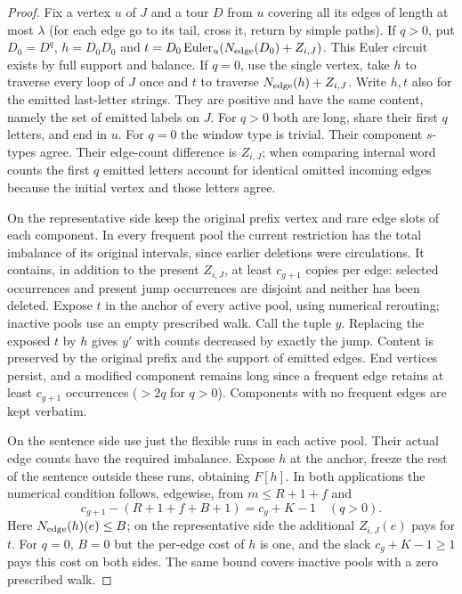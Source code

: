 \documentclass[11pt]{article}
\begin{document}
\begin{proof}
Fix a vertex $u$ of $J$ and a tour $D$ from $u$ covering all its edges of
length at most $\lambda$ (for each edge go to its tail, cross it, return
by simple paths). If $q>0$, put $D_0=D^q$, $h=D_0D_0$ and
$t=D_0\operatorname{Euler}_u(N_{\rm edge}(D_0)+Z_{i,J})$.
This Euler circuit exists by full support and balance. If $q=0$, use the
single vertex, take $h$ to traverse every loop of $J$ once and $t$ to
traverse $N_{\rm edge}(h)+Z_{i,J}$. Write $h,t$ also for the emitted
last-letter strings. They are positive and have the same content, namely
the set of emitted labels on $J$. For $q>0$ both are long, share their first
$q$ letters, and end in $u$. For $q=0$ the window type is trivial.
Their component $s$-types agree. Their edge-count difference is $Z_{i,J}$;
when comparing internal word counts the first $q$ emitted letters account
for identical omitted incoming edges because the initial vertex and those
letters agree.

On the representative side keep the original prefix vertex and rare edge
slots of each component. In every frequent pool the current restriction
has the total imbalance of its original intervals, since earlier deletions
were circulations. It contains, in addition to the present $Z_{i,J}$,
at least $c_{g+1}$ copies per edge: selected occurrences and present jump
occurrences are disjoint and neither has been deleted. Expose $t$ in the
anchor of every active pool, using numerical rerouting; inactive pools
use an empty prescribed walk. Call the tuple $y$. Replacing the exposed
$t$ by $h$ gives $y'$ with counts decreased by exactly the jump.
Content is preserved by the original prefix and the support of emitted
edges. End vertices persist, and a modified component remains long since
a frequent edge retains at least $c_{g+1}$ occurrences ($>2q$ for $q>0$).
Components with no frequent edges are kept verbatim.

On the sentence side use just the flexible runs in each active pool.
Their actual edge counts have the required imbalance. Expose $h$ at the
anchor, freeze the rest of the sentence outside these runs, obtaining
$F[h]$. In both applications the numerical condition follows, edgewise,
from $m\le R+1+f$ and
\[
 c_{g+1}-(R+1+f+ B+1)=c_g+K-1\quad(q>0).
\]
Here $N_{\rm edge}(h)(e)\le B$; on the representative side the additional
$Z_{i,J}(e)$ pays for $t$. For $q=0$, $B=0$ but the per-edge cost of
$h$ is one, and the slack $c_g+K-1\ge1$ pays this cost on both sides.
The same bound covers inactive pools with a zero prescribed walk.


\end{proof}
\end{document}
